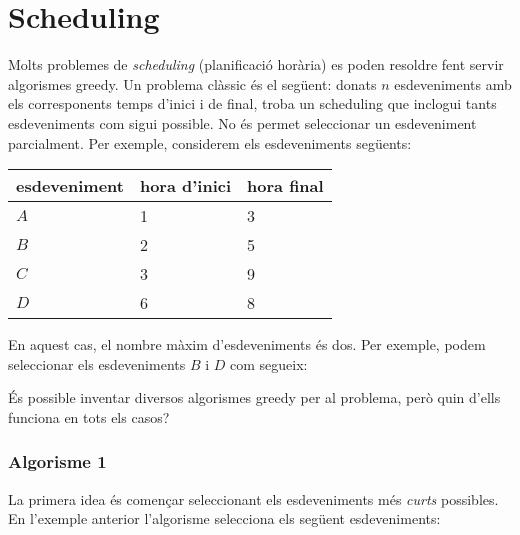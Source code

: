 \section{Scheduling}

Molts problemes de \emph{scheduling} (planificació horària)
es poden resoldre fent servir algorismes greedy.
Un problema clàssic és el següent:
donats $n$ esdeveniments amb els corresponents temps d'inici i
de final, troba un scheduling
que inclogui tants esdeveniments com sigui possible.
No és permet seleccionar un esdeveniment parcialment.
Per exemple, considerem els esdeveniments següents:
\begin{centre}
\begin{tabular}{lll}
esdeveniment & hora d'inici & hora final \\
\hline
$A$ & 1 & 3 \\
$B$ & 2 & 5 \\
$C$ & 3 & 9 \\
$D$ & 6 & 8 \\
\end{tabular}
\end{centre}
En aquest cas, el nombre màxim d'esdeveniments és dos.
Per exemple, podem seleccionar els esdeveniments $B$ i $D$
com segueix:
\begin{center}
\end{center}

És possible inventar diversos algorismes greedy
per al problema, però quin d'ells funciona en tots els casos?

\subsubsection*{Algorisme 1}

La primera idea és començar seleccionant els
esdeveniments més \emph{curts} possibles.
En l'exemple anterior l'algorisme selecciona els següent
esdeveniments:
\begin{center}
\end{center}


